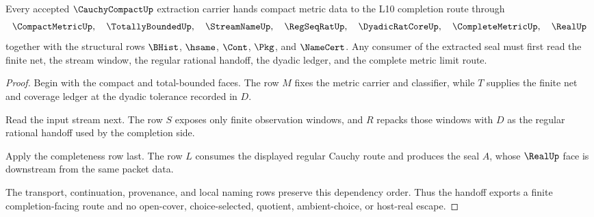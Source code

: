 \begin{theorem}
\label{thm:cauchy-compact-extraction-completion-handoff}
Every accepted $\CauchyCompactUp$ extraction carrier hands compact metric data to the L10 completion route through
$$
\CompactMetricUp,\quad
\TotallyBoundedUp,\quad
\StreamNameUp,\quad
\RegSeqRatUp,\quad
\DyadicRatCoreUp,\quad
\CompleteMetricUp,\quad
\RealUp
$$
together with the structural rows $\BHist$, $\hsame$, $\Cont$, $\Pkg$, and $\NameCert$. Any consumer of the extracted seal must first read the finite net, the stream window, the regular rational handoff, the dyadic ledger, and the complete metric limit route.
\end{theorem}

\begin{proof}
Begin with the compact and total-bounded faces. The row $M$ fixes the metric carrier and classifier, while $T$ supplies the finite net and coverage ledger at the dyadic tolerance recorded in $D$.

Read the input stream next. The row $S$ exposes only finite observation windows, and $R$ repacks those windows with $D$ as the regular rational handoff used by the completion side.

Apply the completeness row last. The row $L$ consumes the displayed regular Cauchy route and produces the seal $A$, whose $\RealUp$ face is downstream from the same packet data.

The transport, continuation, provenance, and local naming rows preserve this dependency order. Thus the handoff exports a finite completion-facing route and no open-cover, choice-selected, quotient, ambient-choice, or host-real escape.
\end{proof}
